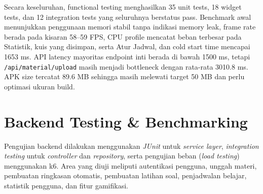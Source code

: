\documentclass[11pt]{article}
\begin{document}
\begin{center}
\renewcommand{\arraystretch}{1.2}
\end{center}

Secara keseluruhan, functional testing menghasilkan 35 unit tests, 18 widget tests, dan 12 integration tests yang seluruhnya berstatus pass. Benchmark awal menunjukkan penggunaan memori stabil tanpa indikasi memory leak, frame rate berada pada kisaran 58--59 FPS, CPU profile mencatat beban terbesar pada Statistik, kuis yang disimpan, serta Atur Jadwal, dan cold start time mencapai 1653 ms. API latency mayoritas endpoint inti berada di bawah 1500 ms, tetapi \texttt{/api/material/upload} masih menjadi bottleneck dengan rata-rata 3010.8 ms. APK size tercatat 89.6 MB sehingga masih melewati target 50 MB dan perlu optimasi ukuran build.

\section{Backend Testing \& Benchmarking}

Pengujian backend dilakukan menggunakan \textit{JUnit} untuk \textit{service layer}, \textit{integration testing} untuk \textit{controller} dan \textit{repository}, serta pengujian beban (\textit{load testing}) menggunakan k6. Area yang diuji meliputi autentikasi pengguna, unggah materi, pembuatan ringkasan otomatis, pembuatan latihan soal, penjadwalan belajar, statistik pengguna, dan fitur gamifikasi.
\end{document}
